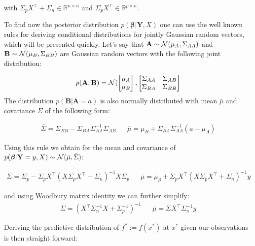 with $\Sigma_p X^{\top} + \Sigma_n \in \mathbb{R}^{n\times n}$ and $\Sigma_p X^{\top} \in \mathbb{R}^{p\times n}$.

To find now the posterior distribution $p(\boldsymbol{\beta} |  \mathbf{Y}, X)$ one can use the well known rules for deriving conditional
distributions for jointly Gaussian random vectors, which will be presented quickly.
Let's say that $\mathbf{A} \sim \operatorname{\mathcal{N}}(\mu_A, \Sigma_{AA})$ and $\mathbf{B} \sim \operatorname{\mathcal{N}}(\mu_B, \Sigma_{BB})$ are
Gaussian random vectors with the following joint distribution:

\begin{gather}
    p(\mathbf{A}, \mathbf{B}) = \operatorname{\mathcal{N}}(
    \begin{bmatrix}
        \mu_A \\
        \mu_B
    \end{bmatrix},
    \begin{bmatrix}
        \Sigma_{AA} & \Sigma_{AB} \\
        \Sigma_{BA} & \Sigma_{BB}
    \end{bmatrix}
\end{gather}
The distribution $p(\mathbf{B} | \mathbf{A}=a)$ is also normally distributed with mean $\bar{\mu}$ and covariance
$\bar{\Sigma}$ of the following form:

\begin{align}\label{def:conditioning}
    \bar{\Sigma} = \Sigma_{B B} - \Sigma_{B A} \Sigma_{A A}^{-1} \Sigma_{A B} & & \bar{\mu} = \mu_{B} + \Sigma_{BA} \Sigma_{AA}^{-1}(a - \mu_A)
\end{align}


Using this rule we obtain for the mean and covariance of $p(\boldsymbol{\beta} | \mathbf{Y}=y, X) \sim \operatorname{\mathcal{N}}(\bar{\mu}, \bar{\Sigma})$:

\begin{align*}
    \bar{\Sigma} = \Sigma_{p} - \Sigma_p X^{\top}(X \Sigma_p X^{\top} + \Sigma_n)^{-1} X  \Sigma_p & & \bar{\mu} = \mu_{\beta} + \Sigma_p X^{\top}(X \Sigma_p X^{\top} + \Sigma_n)^{-1}y
\end{align*}

and using Woodbury matrix identity we can further simplify:
\begin{align*}
    \bar{\Sigma} = (X^{\top}\Sigma_n^{-1}X + \Sigma_p^{-1})^{-1} & & \bar{\mu} = \bar{\Sigma} X^{\top} \Sigma_n^{-1} y
\end{align*}

Deriving the predictive distribution of $f^{\ast} := f(x^{\ast})$ at $x^{\ast}$ given our
observations is then straight forward:

